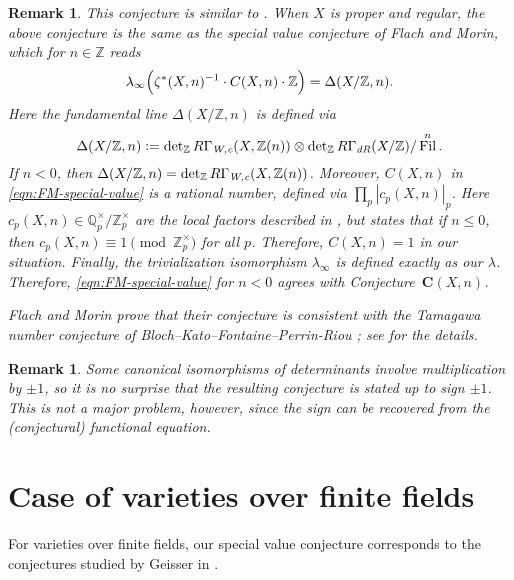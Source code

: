 \documentclass[10pt,a4paper,oneside]{article}
\DeclareMathOperator{\Fil}{Fil}
\newcommand{\QQ}{\mathbb{Q}}
\newcommand{\ZZ}{\mathbb{Z}}
\renewcommand{\det}{\operatorname{det}}
\newcommand{\dR}{\text{\it dR}}
\newcommand{\Wc}{\text{\it W,c}}
\newcommand{\dfn}{\mathrel{\mathop:}=}
\theoremstyle{myplain}
\theoremstyle{mydefinition}
\newtheorem{remark}[theorem]{Remark}
\numberwithin{equation}{section}
\begin{document}
\begin{remark}
  This conjecture is similar to \cite[Conjecture~5.12]{Flach-Morin-2018}.
  When $X$ is proper and regular, the above conjecture is the same as the
  special value conjecture of Flach and Morin, which for $n \in \ZZ$ reads
  \begin{equation}
    \label{eqn:FM-special-value}
    \lambda_\infty \Bigl(\zeta^* (X,n)^{-1} \cdot C (X,n) \cdot \ZZ\Bigr) =
    \Delta (X/\ZZ, n).
  \end{equation}
  Here the fundamental line $\Delta (X/\ZZ,n)$ is defined via
  \[ \Delta (X/\ZZ,n) \dfn
    \det_\ZZ R\Gamma_\Wc (X, \ZZ(n)) \otimes
    \det_\ZZ R\Gamma_\dR (X/\ZZ)/\Fil^n. \]
  If $n < 0$, then
  $\Delta (X/\ZZ,n) = \det_\ZZ R\Gamma_\Wc (X, \ZZ(n))$. Moreover, $C (X,n)$
  in \eqref{eqn:FM-special-value} is a rational number, defined via
  $\prod_p |c_p (X,n)|_p$.  Here $c_p (X,n) \in \QQ_p^\times/\ZZ_p^\times$ are
  the local factors described in \cite[\S 5.4]{Flach-Morin-2018}, but
  \cite[Proposition~5.8]{Flach-Morin-2018} states that if $n \le 0$, then
  $c_p (X,n) \equiv 1 \pmod{\ZZ_p^\times}$ for all $p$. Therefore, $C (X,n) = 1$
  in our situation. Finally, the trivialization isomorphism $\lambda_\infty$ is
  defined exactly as our $\lambda$. Therefore, \eqref{eqn:FM-special-value} for
  $n < 0$ agrees with Conjecture~$\mathbf{C} (X,n)$.

  Flach and Morin prove that their conjecture is consistent with the Tamagawa
  number conjecture of Bloch--Kato--Fontaine--Perrin-Riou
  \cite{Fontaine-Perrin-Riou-1994}; see \cite[\S 5.6]{Flach-Morin-2018} for the
  details.
\end{remark}

\begin{remark}
  Some canonical isomorphisms of determinants involve multiplication by $\pm 1$,
  so it is no surprise that the resulting conjecture is stated up to sign
  $\pm 1$. This is not a major problem, however, since the sign can be recovered
  from the (conjectural) functional equation.
\end{remark}


\section{Case of varieties over finite fields}
\label{sec:finite-fields}

For varieties over finite fields, our special value conjecture corresponds to
the conjectures studied by Geisser in
\cite{Geisser-2004,Geisser-2006,Geisser-2010-arithmetic-homology}.
\end{document}
